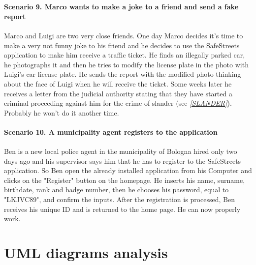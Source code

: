 \documentclass[a4paper]{report}
\begin{document}
\\ 
\\
\label{use:slander}\textbf{Scenario 9. Marco wants to make a joke to a friend and send a fake report}\\
\\
Marco and Luigi are two very close friends. One day Marco decides it's time to make a very not funny joke to his friend and he decides to use the SafeStreets application to make him receive a traffic ticket. He finds an illegally parked car, he photographs it and then he tries to modify the license plate in the photo with Luigi's car license plate. He sends the report with the modified photo thinking about the face of Luigi when he will receive the ticket. 
Some weeks later he receives a letter from the judicial authority stating that they have started a criminal proceeding against him for the crime of slander (see \hyperref[ref:slander]{\textit{[SLANDER]}}).
Probably he won't do it another time. 
\\ 
\\
\textbf{Scenario 10. A municipality agent registers to the application}\\
\\
Ben is a new local police agent in the municipality of Bologna hired only two days ago and his supervisor says him that he has to register to the SafeStreets application. So Ben open the already installed application from his Computer and clicks on the "Register" button on the homepage. He inserts his name, surname, birthdate, rank and badge number, then he chooses his password, equal to "LKJVC89", and confirm the inputs. After the registration is processed, Ben receives his unique ID and is returned to the home page. He can now properly work.

\section{UML diagrams analysis}
\end{document}

